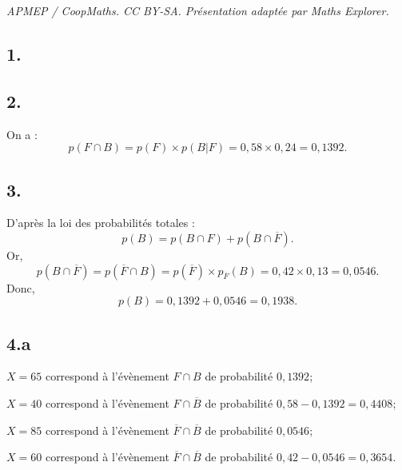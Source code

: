 \documentclass[10pt]{article}
\begin{document}
\noindent\textit{APMEP / CoopMaths. CC BY-SA. Présentation adaptée par Maths Explorer.}\par\medskip
\subsection*{1.}
	\begin{center}
	\end{center}
	
	\subsection*{2.}
	On a :
	\[
	p(F \cap B) = p(F) \times p(B|F) = 0,58 \times 0,24 = 0,1392.
	\]
	
	\subsection*{3.}
	D'après la loi des probabilités totales :
	\[
	p(B) = p(B \cap F) + p(B \cap \overline{F}).
	\]
	Or,
	\[
	p(B \cap \overline{F}) = p(\overline{F} \cap B) = p(\overline{F}) \times p_{\overline{F}}(B) = 0,42 \times 0,13 = 0,0546.
	\]
	Donc,
	\[
	p(B) = 0,1392 + 0,0546 = 0,1938.
	\]
	
	\subsection*{4.a}
	\(X = 65\) correspond à l'évènement \(F \cap B\) de probabilité \(0,1392\);
	
	\(X = 40\) correspond à l'évènement \(F \cap \overline{B}\) de probabilité \(0,58 - 0,1392 = 0,4408\);
	
	\(X = 85\) correspond à l'évènement \(\overline{F} \cap \overline{B}\) de probabilité \(0,0546\);
	
	\(X = 60\) correspond à l'évènement \(\overline{F} \cap \overline{B}\) de probabilité \(0,42 - 0,0546 = 0,3654\).
	
\end{document}
